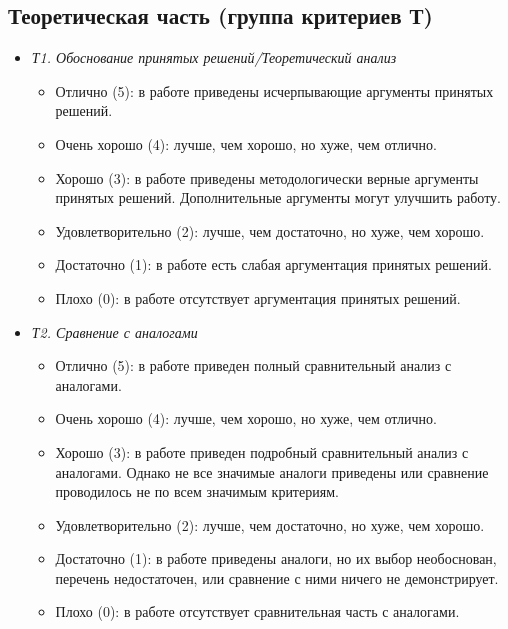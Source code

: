 \documentclass{article}
\begin{document}
\subsection{Теоретическая часть (группа критериев Т)}
\begin{itemize}
    \item \textit{Т1. Обоснование принятых решений/Теоретический анализ}
    \begin{itemize}
        \item Отлично (5): в работе приведены исчерпывающие аргументы принятых решений.
        \item Очень хорошо (4): лучше, чем хорошо, но хуже, чем отлично.
        \item Хорошо (3): в работе приведены методологически верные аргументы принятых решений. Дополнительные аргументы могут улучшить работу.
        \item Удовлетворительно (2): лучше, чем достаточно, но хуже, чем хорошо.
        \item Достаточно (1): в работе есть слабая аргументация принятых решений.
        \item Плохо (0): в работе отсутствует аргументация принятых решений.
    \end{itemize}
    \item \textit{Т2. Сравнение с аналогами}
    \begin{itemize}
        \item Отлично (5): в работе приведен полный сравнительный анализ с аналогами. 
        \item Очень хорошо (4): лучше, чем хорошо, но хуже, чем отлично.
        \item Хорошо (3): в работе приведен подробный сравнительный анализ с аналогами. Однако не все значимые аналоги приведены или сравнение проводилось не по всем значимым критериям.
        \item Удовлетворительно (2): лучше, чем достаточно, но хуже, чем хорошо.
        \item Достаточно (1): в работе приведены аналоги, но их выбор необоснован, перечень недостаточен, или сравнение с ними ничего не демонстрирует.
        \item Плохо (0): в работе отсутствует сравнительная часть с аналогами.
    \end{itemize}
\end{itemize}
\end{document}
